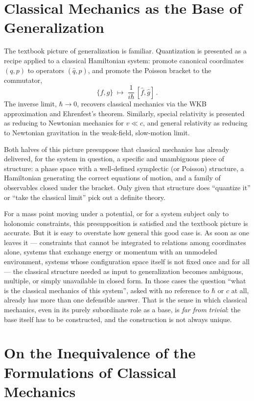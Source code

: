 \section{Classical Mechanics as the Base of Generalization}
\label{cm:ba}

The textbook picture of generalization is familiar. Quantization is presented as
a recipe applied to a classical Hamiltonian system: promote canonical coordinates
$(q,p)$ to operators $(\hat q,\hat p)$, and promote the Poisson bracket to the
commutator,
\begin{equation}
  \{f,g\} \;\longmapsto\; \frac{1}{i\hbar}\,[\hat f,\hat g] \, .
\end{equation}
The inverse limit, $\hbar \to 0$, recovers classical mechanics via the WKB
approximation and Ehrenfest's theorem. Similarly, special relativity is presented
as reducing to Newtonian mechanics for $v \ll c$, and general relativity as
reducing to Newtonian gravitation in the weak-field, slow-motion limit.

Both halves of this picture presuppose that classical mechanics has already
delivered, for the system in question, a specific and unambiguous piece of
structure: a phase space with a well-defined symplectic (or Poisson) structure,
a Hamiltonian generating the correct equations of motion, and a family of
observables closed under the bracket. Only given that structure does
``quantize it'' or ``take the classical limit'' pick out a definite theory.

For a mass point moving under a potential, or for a system subject only to
holonomic constraints, this presupposition is satisfied and the textbook picture
is accurate. But it is easy to overstate how general this good case is. As soon
as one leaves it --- constraints that cannot be integrated to relations among
coordinates alone, systems that exchange energy or momentum with an unmodeled
environment, systems whose configuration space itself is not fixed once and for
all --- the classical structure needed as input to generalization becomes
ambiguous, multiple, or simply unavailable in closed form. In those cases the
question ``what is the classical mechanics of this system'', asked with no
reference to $\hbar$ or $c$ at all, already has more than one defensible answer.
That is the sense in which classical mechanics, even in its purely subordinate
role as a base, is \emph{far from trivial}: the base itself has to be constructed,
and the construction is not always unique.


\section{On the Inequivalence of the Formulations of Classical Mechanics}

